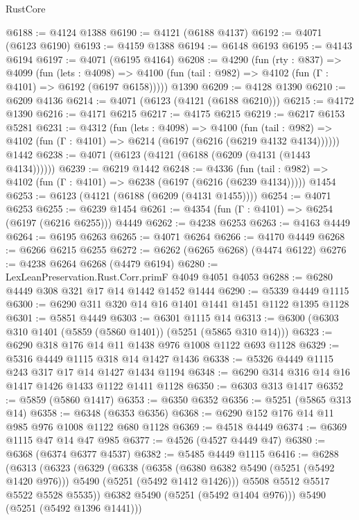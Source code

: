 \begin{lexlean}{RustCore}
\begin{coremodule}
@6188 := @4124 @1388
@6190 := @4121 (@6188 @4137)
@6192 := @4071 (@6123 @6190)
@6193 := @4159 @1388
@6194 := @6148 @6193
@6195 := @4143 @6194
@6197 := @4071 (@6195 @4164)
@6208 := @4290
    (fun (rty : @837) =>
    @4099
      (fun (lets : @4098) =>
      @4100 (fun (tail : @982) => @4102 (fun (Γ : @4101) => @6192 (@6197 @6158)))))
    @1390
@6209 := @4128 @1390
@6210 := @6209 @4136
@6214 := @4071 (@6123 (@4121 (@6188 @6210)))
@6215 := @4172 @1390
@6216 := @4171 @6215
@6217 := @4175 @6215
@6219 := @6217 @6153 @5281
@6231 := @4312
    (fun (lets : @4098) =>
    @4100
      (fun (tail : @982) => @4102 (fun (Γ : @4101) => @6214 (@6197 (@6216 (@6219 @4132 @4134))))))
    @1442
@6238 := @4071 (@6123 (@4121 (@6188 (@6209 (@4131 (@1443 @4134))))))
@6239 := @6219 @1442
@6248 := @4336
    (fun (tail : @982) => @4102 (fun (Γ : @4101) => @6238 (@6197 (@6216 (@6239 @4134)))))
    @1454
@6253 := @6123 (@4121 (@6188 (@6209 (@4131 @1455))))
@6254 := @4071 @6253
@6255 := @6239 @1454
@6261 := @4354 (fun (Γ : @4101) => @6254 (@6197 (@6216 @6255))) @4449
@6262 := @4238 @6253
@6263 := @4163 @4449
@6264 := @6195 @6263
@6265 := @4071 @6264
@6266 := @4170 @4449
@6268 := @6266 @6215 @6255
@6272 := @6262 (@6265 @6268) (@4474 @6122)
@6276 := @4238 @6264 @6268 (@4479 @6194)
@6280 := LexLeanPreservation.Rust.Corr.primF @4049 @4051 @4053
@6288 := @6280 @4449 @308 @321 @17 @14 @1442 @1452 @1444
@6290 := @5339 @4449 @1115
@6300 := @6290 @311 @320 @14 @16 @1401 @1441 @1451 @1122 @1395 @1128
@6301 := @5851 @4449
@6303 := @6301 @1115 @14
@6313 := @6300 (@6303 @310 @1401 (@5859 (@5860 @1401)) (@5251 (@5865 @310 @14)))
@6323 := @6290 @318 @176 @14 @11 @1438 @976 @1008 @1122 @693 @1128
@6329 := @5316 @4449 @1115 @318 @14 @1427 @1436
@6338 := @5326 @4449 @1115 @243 @317 @17 @14 @1427 @1434 @1194
@6348 := @6290 @314 @316 @14 @16 @1417 @1426 @1433 @1122 @1411 @1128
@6350 := @6303 @313 @1417
@6352 := @5859 (@5860 @1417)
@6353 := @6350 @6352
@6356 := @5251 (@5865 @313 @14)
@6358 := @6348 (@6353 @6356)
@6368 := @6290 @152 @176 @14 @11 @985 @976 @1008 @1122 @680 @1128
@6369 := @4518 @4449
@6374 := @6369 @1115 @47 @14 @47 @985
@6377 := @4526 (@4527 @4449 @47)
@6380 := @6368 (@6374 @6377 @4537)
@6382 := @5485 @4449 @1115
@6416 := @6288
    (@6313
      (@6323
        (@6329
          (@6338
            (@6358 (@6380 @6382 @5490 (@5251 (@5492 @1420 @976))) @5490 (@5251 (@5492 @1412 @1426)))
            @5508
            @5512
            @5517
            @5522
            @5528
            @5535))
        @6382
        @5490
        (@5251 (@5492 @1404 @976)))
      @5490
      (@5251 (@5492 @1396 @1441)))

\end{coremodule}
\end{lexlean}
